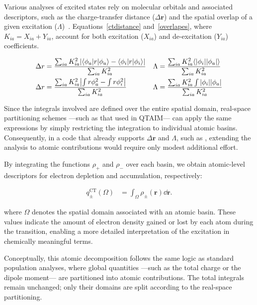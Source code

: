 Various analyses of excited states rely on molecular orbitals and associated
descriptors, such as the charge-transfer distance ($\Delta\mathbf{r}$) and the
spatial overlap of a given excitation ($\Lambda$)~\cite{Peach2008,Guido2013}.
Equations~\ref{ctdistance} and~\ref{overlapes}, where $K_{ia} = X_{ia} +
Y_{ia}$, account for both excitation ($X_{ia}$) and de-excitation ($Y_{ia}$)
coefficients.

\begin{align}
  \Delta r &= \frac{\sum_{ia}K_{ia}^2\abs{\langle\phi_a|r|\phi_a\rangle -
    \langle\phi_i|r|\phi_i\rangle}}{\sum_{ia}K_{ia}^2} &
  \Lambda  &= \frac{\sum_{ia}K_{ia}^2\langle\abs{\phi_i}\abs{\phi_a}\rangle}{\sum_{ia}K_{ia}^2} \label{ctdistance}\\
  \Delta r &= \frac{\sum_{ia}K_{ia}^2\abs{\int r\phi_a^2 -
    \int r\phi_i^2}}{\sum_{ia}K_{ia}^2} &
  \Lambda  &= \frac{\sum_{ia}K_{ia}^2\int\abs{\phi_i}\abs{\phi_a}}{\sum_{ia}K_{ia}^2} \label{overlapes}
\end{align}

\newpage
Since the integrals involved are defined over the entire spatial domain,
real-space partitioning schemes ---such as that used in \gls{QTAIM}--- 
can apply the same expressions by simply restricting the integration to individual atomic basins.
Consequently, in a code that already supports $\Delta\mathbf{r}$ and $\Lambda$,
such as \adf,
extending the analysis to atomic contributions would require only modest additional effort.

By integrating the functions $\rho_+$ and $\rho_-$ over each basin, we obtain
atomic-level descriptors for electron depletion and accumulation, respectively:

\begin{align}
  q_\pm^\mathrm{CT}(\Omega) &= \int_{\Omega} \rho_\pm(\mathbf{r})\dd\mathbf{r}.
\end{align}

\noindent where $\Omega$ denotes the spatial domain associated with an atomic
basin. These values indicate the amount of electron density gained or lost by
each atom during the transition, enabling a more detailed interpretation of the
excitation in chemically meaningful terms.

Conceptually, this atomic decomposition follows the same logic as standard
population analyses, where global quantities ---such as the total charge or the
dipole moment--- are partitioned into atomic contributions. The total integrals
remain unchanged; only their domains are split according to the real-space
partitioning.




